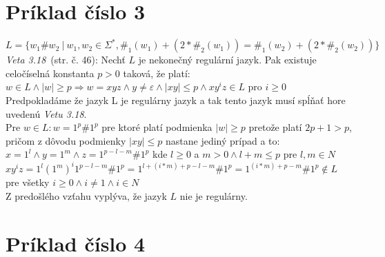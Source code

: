 \documentclass[11pt,a4paper]{article}
\begin{document}
\newpage
\section{Príklad číslo 3}
$L = \{ w_1\#w_2\ |\ w_1,w_2 \in \Sigma^*, \#_1(w_1) + (2 * \#_2(w_1)) = \#_1(w_2) + (2 * \#_2(w_2))\}$\\

\textit{Veta 3.18}~\cite{TIN}(str. č. 46): Nechť $L$ je nekonečný regulární jazyk. Pak existuje celočíselná konstanta $p>0$ taková, že platí: $w \in L \wedge |w| \geq p \Rightarrow w = xyz \wedge y \neq \varepsilon \wedge |xy| \leq p \wedge xy^iz \in L$ pro $i \geq 0$\\

Predpokladáme že jazyk L je regulárny jazyk a tak tento jazyk musí spĺňať hore uvedenú \textit{Vetu 3.18}.\\

Pre $w \in L: w=1^p\#1^p$ pre ktoré platí podmienka $|w| \geq p$ pretože platí $2p+1>p$, pričom z dôvodu podmienky $|xy| \leq p$ nastane jediný prípad a to:\\

$x=1^l \wedge y=1^m \wedge z=1^{p-l-m}\#1^p$ kde $l \geq 0$ a $m > 0 \wedge l+m \leq p$ pre $l,m \in N$\\

$xy^iz = 1^l(1^{m})^i1^{p-l-m}\#1^p = 1^{l+(i*m)+p-l-m}\#1^p = 1^{(i*m)+p-m}\#1^p \notin L$ pre všetky $i \geq 0 \wedge i \neq 1 \wedge i \in N$\\

Z predošlého vzťahu vyplýva, že jazyk $L$ nie je regulárny.

\section{Príklad číslo 4}
\end{document}
